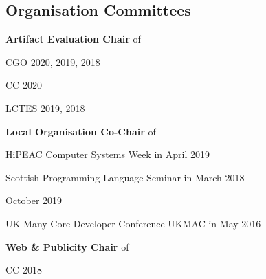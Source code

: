 \documentclass[11pt,a4paper]{moderncv}
\newcommand{\strong}[1]{\textcolor{color1}{\textbf{#1}}}
\newcommand{\highlight}[1]{\textcolor{color1}{#1}}
\begin{document}
\subsection{Organisation Committees}
\begin{cvitemize}
    \item \strong{Artifact Evaluation Chair} of
        \begin{inlineItemize}
            \item \highlight{CGO 2020, 2019, 2018}
            \item \highlight{CC 2020}
            \item \highlight{LCTES 2019, 2018}
        \end{inlineItemize}
    \item \strong{Local Organisation Co-Chair} of
        \begin{inlineItemize}
            \item \highlight{HiPEAC Computer Systems Week} in April 2019
            \item \highlight{Scottish Programming Language Seminar} in March 2018
            \item October 2019
            \item \highlight{UK Many-Core Developer Conference UKMAC} in May 2016
        \end{inlineItemize}
    \item \strong{Web \& Publicity Chair} of
        \begin{inlineItemize}
            \item \highlight{CC 2018}
        \end{inlineItemize}
\end{cvitemize}
\end{document}
